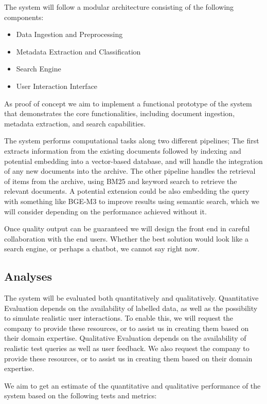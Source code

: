 The system will follow a modular architecture consisting of the following components:
\begin{itemize}
    \item Data Ingestion and Preprocessing
    \item Metadata Extraction and Classification     
    \item Search Engine
    \item User Interaction Interface
\end{itemize}

As proof of concept we aim to implement a functional prototype of the system that demonstrates the core functionalities, including document ingestion, metadata extraction, and search capabilities.

The system performs computational tasks along two different pipelines; The first extracts information from the existing documents followed by indexing and potential embedding into a vector-based database, and will handle the integration of any new documents into the archive.
The other pipeline handles the retrieval of items from the archive, using BM25 and keyword search to retrieve the relevant documents. 
A potential extension could be also embedding the query with something like BGE-M3 to improve results using semantic search, which we will consider depending on the performance achieved without it.

Once quality output can be guaranteed we will design the front end in careful collaboration with the end users.
Whether the best solution would look like a search engine, or perhaps a chatbot, we cannot say right now.

\subsection{Analyses}

The system will be evaluated both quantitatively and qualitatively.
Quantitative Evaluation depends on the availability of labelled data, as well as the possibility to simulate realistic user interactions. 
To enable this, we will request the company to provide these resources, or to assist us in creating them based on their domain expertise.
Qualitative Evaluation depends on the availability of realistic test queries as well as user feedback. 
We also request the company to provide these resources, or to assist us in creating them based on their domain expertise.

We aim to get an estimate of the quantitative and qualitative performance of the system based on the following tests and metrics:


